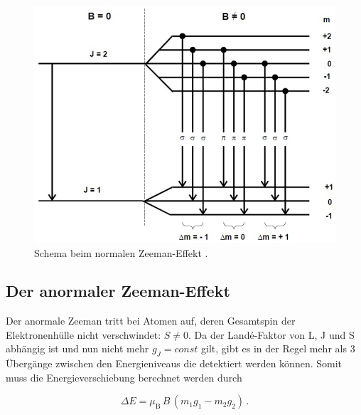 \vspace{-5pt}
\begin{figure}[H]
    \centering
    \includegraphics[scale=0.3]{normalerzeeman.png}
    \caption{Schema beim normalen Zeeman-Effekt \cite{V27}.}
    \label{fig:norm}
\end{figure}

\subsection{Der anormaler Zeeman-Effekt}
Der anormale Zeeman tritt bei Atomen auf, deren Gesamtspin der Elektronenhülle nicht verschwindet: $S \neq 0$. Da der Landé-Faktor von L, J und S abhängig ist und nun nicht mehr 
$g_J = const$ gilt, gibt es in der Regel mehr als 3 Übergänge zwischen den Energieniveaus die detektiert werden können. Somit muss die Energieverschiebung berechnet werden durch 

\vspace{-15pt}
\begin{equation}
    \Delta E = \mu_\text{B}\,B\,(m_1 g_1 - m_2 g_2) \, .
    \label{eqn:anorm}
\end{equation}
